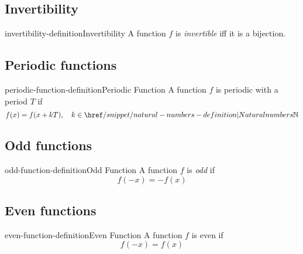\documentclass[preview]{standalone}
\begin{document}
\subsection{Invertibility}

\begin{snippetdefinition}{invertibility-definition}{Invertibility}
    A function \(f\) is \textit{invertible} iff it is a bijection.
\end{snippetdefinition}

\subsection{Periodic functions}

\begin{snippetdefinition}{periodic-function-definition}{Periodic Function}
    A function \(f\) is periodic with a period \(T\) if
    \[
        f(x) = f(x + kT), \quad k \in \naturalnumbers
    \]
\end{snippetdefinition}

\subsection{Odd functions}

\begin{snippetdefinition}{odd-function-definition}{Odd Function}
    A function \(f\) is \textit{odd} if
    \[
        f(-x) = -f(x)
    \]
\end{snippetdefinition}

\subsection{Even functions}

\begin{snippetdefinition}{even-function-definition}{Even Function}
    A function \(f\) is even if
    \[
        f(-x) = f(x)
    \]
\end{snippetdefinition}
\end{document}
